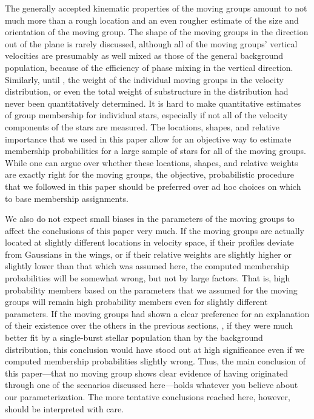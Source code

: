 The generally accepted kinematic properties of the moving groups
amount to not much more than a rough location and an even rougher
estimate of the size and orientation of the moving group. The shape of
the moving groups in the direction out of the plane is rarely
discussed, although all of the moving groups' vertical velocities are
presumably as well mixed as those of the general background
population, because of the efficiency of phase mixing in the vertical
direction. Similarly, until \bhr, the weight of the individual moving
groups in the velocity distribution, or even the total weight of
substructure in the distribution had never been quantitatively
determined. It is hard to make quantitative estimates of group
membership for individual stars, especially if not all of the velocity
components of the stars are measured. The locations, shapes, and
relative importance that we used in this paper allow for an objective
way to estimate membership probabilities for a large sample of stars
for all of the moving groups. While one can argue over whether these
locations, shapes, and relative weights are exactly right for the
moving groups, the objective, probabilistic procedure that we followed
in this paper should be preferred over ad hoc choices on which to base
membership assignments.

We also do not expect small biases in the parameters of the moving
groups to affect the conclusions of this paper very much. If the
moving groups are actually located at slightly different locations in
velocity space, if their profiles deviate from Gaussians in the wings,
or if their relative weights are slightly higher or slightly lower
than that which was assumed here, the computed membership
probabilities will be somewhat wrong, but not by large factors. That
is, high probability members based on the parameters that we assumed
for the moving groups will remain high probability members even for
slightly different parameters. If the moving groups had shown a clear
preference for an explanation of their existence over the others in
the previous sections, \eg, if they were much better fit by a
single-burst stellar population than by the background distribution,
this conclusion would have stood out at high significance even if we
computed membership probabilities slightly wrong. Thus, the main
conclusion of this paper---that no moving group shows clear evidence
of having originated through one of the scenarios discussed
here---holds whatever you believe about our parameterization. The more
tentative conclusions reached here, however, should be interpreted
with care.

